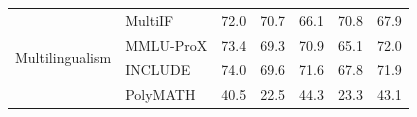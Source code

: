 \begin{table}[t]
\begin{tabular}{lllllll}
\midrule
\multirow{4}{*}{Multilingualism}       & MultiIF                & 72.0                       & 70.7                     & 66.1       & 70.8        & 67.9                           \\
                                       & MMLU-ProX              & 73.4                       & 69.3                     & 70.9        & 65.1       & 72.0                           \\
                                       & INCLUDE                & 74.0                       & 69.6                     & 71.6      & 67.8         & 71.9                           \\
                                       & PolyMATH               & 40.5          & 22.5  & 44.3        & 23.3       & 43.1            \\              
\bottomrule
\end{tabular}
\label{tab: exp_qwen3_vl_30b_a3b_nothinking}
\end{table}

